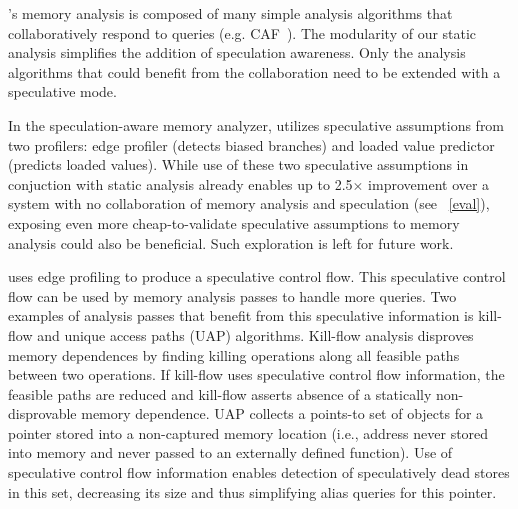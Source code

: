 %
%

\name's memory analysis is composed of many simple analysis algorithms
that collaboratively respond to queries (e.g.
CAF~\cite{johnson:cgo:17}).
%
The modularity of our static analysis simplifies the addition of
speculation awareness. Only the analysis algorithms that could
benefit from the collaboration need to be extended with a
speculative mode.
%

In the speculation-aware memory analyzer, \name utilizes speculative
assumptions from two profilers: edge profiler (detects biased
branches) and loaded value predictor (predicts loaded values).
%
While use of these two speculative assumptions in conjuction with
static analysis already enables up to 2.5$\times$ improvement over a
system with no collaboration of memory analysis and speculation (see
~\cref{eval}), exposing even more cheap-to-validate speculative
assumptions to memory analysis could also be beneficial.  Such
exploration is left for future work.

\name uses edge profiling to produce a speculative control flow. This
speculative control flow can be used by memory analysis passes to
handle more queries.
%
Two examples of analysis passes that benefit from this speculative
information is kill-flow and unique access paths (UAP) algorithms.
%
Kill-flow analysis disproves memory dependences by finding killing
operations along all feasible paths between two operations.  If
kill-flow uses speculative control flow information, the feasible
paths are reduced and kill-flow asserts absence of a statically
non-disprovable memory dependence.
%
UAP collects a points-to set of objects for a pointer stored into a
non-captured memory location (i.e., address never stored into memory
and never passed to an externally defined function).
Use of speculative control flow information enables detection of
speculatively dead stores in this set, decreasing its size and thus
simplifying alias queries for this pointer.

